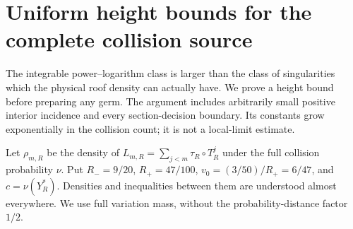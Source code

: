 \section{Uniform height bounds for the complete collision source}
\label{sec:v44-complete-height}
The integrable power--logarithm class is larger than the class of
singularities which the physical roof density can actually have. We
prove a height bound before preparing any germ. The argument includes
arbitrarily small positive interior incidence and every section-decision
boundary. Its constants grow exponentially in the collision count;
it is not a local-limit estimate.

Let $\rho_{m,R}$ be the density of $L_{m,R}=\sum_{j<m}\tau_R\circ T_R^j$
under the full collision probability $\nu$. Put $R_-=9/20$, $R_+=47/100$,
$v_0=(3/50)/R_+=6/47$, and $c=\nu(Y_R^*)$. Densities and inequalities
between them are understood almost everywhere. We use full variation
mass, without the probability-distance factor $1/2$.

